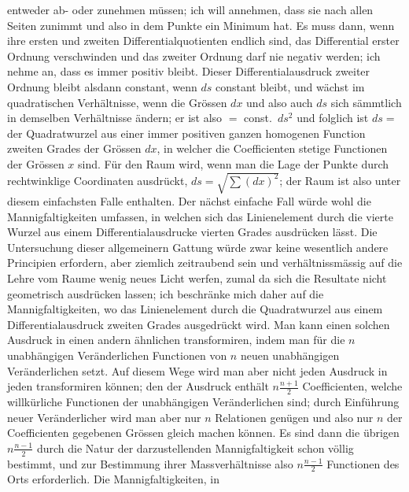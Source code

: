 \documentclass[a4paper,12pt]{article}
\begin{document}
entweder ab- oder zunehmen m\"{u}ssen; ich will annehmen, dass
sie nach allen Seiten zunimmt und also in dem Punkte ein Minimum
hat.  Es muss dann, wenn ihre ersten und zweiten
Differentialquotienten endlich sind, das Differential erster
Ordnung verschwinden und das zweiter Ordnung darf nie negativ
werden; ich nehme an, dass es immer positiv bleibt.  Dieser
Differentialausdruck zweiter Ordnung bleibt alsdann constant,
wenn $ds$ constant bleibt, und w\"{a}chst im quadratischen
Verh\"{a}ltnisse, wenn die Gr\"{o}ssen $dx$ und also auch $ds$
sich s\"{a}mmtlich in demselben Verh\"{a}ltnisse \"{a}ndern; er
ist also $=$ const.~$ds^2$ und folglich ist $ds =$ der
Quadratwurzel aus einer immer positiven ganzen homogenen Function
zweiten Grades der Gr\"{o}ssen $dx$, in welcher die Coefficienten
stetige Functionen der Gr\"{o}ssen $x$ sind.  F\"{u}r den Raum
wird, wenn man die Lage der Punkte durch rechtwinklige
Coordinaten ausdr\"{u}ckt,
$ds = \sqrt{ \sum (dx)^2 }$;
der Raum ist also unter diesem einfachsten Falle enthalten.  Der
n\"{a}chst einfache Fall w\"{u}rde wohl die Mannigfaltigkeiten
umfassen, in welchen sich das Linienelement durch die vierte
Wurzel aus einem Differentialausdrucke vierten Grades
ausdr\"{u}cken l\"{a}sst.  Die Untersuchung dieser allgemeinern
Gattung w\"{u}rde zwar keine wesentlich andere Principien
erfordern, aber ziemlich zeitraubend sein und
verh\"{a}ltnissm\"{a}ssig auf die Lehre vom Raume wenig neues
Licht werfen, zumal da sich die Resultate nicht geometrisch
ausdr\"{u}cken lassen; ich beschr\"{a}nke mich daher auf die
Mannigfaltigkeiten, wo das Linienelement durch die Quadratwurzel
aus einem Differentialausdruck zweiten Grades ausgedr\"{u}ckt
wird.  Man kann einen solchen Ausdruck in einen andern
\"{a}hnlichen transformiren, indem man f\"{u}r die $n$
unabh\"{a}ngigen Ver\"{a}nderlichen Functionen von $n$ neuen
unabh\"{a}ngigen Ver\"{a}nderlichen setzt.  Auf diesem Wege wird
man aber nicht jeden Ausdruck in jeden transformiren k\"{o}nnen;
den der Ausdruck enth\"{a}lt
$\displaystyle n \frac{n+1}{2}$
Coefficienten, welche willk\"{u}rliche Functionen der
unabh\"{a}ngigen Ver\"{a}nderlichen sind; durch Einf\"{u}hrung
neuer Ver\"{a}nderlicher wird man aber nur $n$ Relationen
gen\"{u}gen und also nur $n$ der Coefficienten gegebenen
Gr\"{o}ssen gleich machen k\"{o}nnen.  Es sind dann die
\"{u}brigen
$\displaystyle n \frac{n-1}{2}$
durch die Natur der darzustellenden Mannigfaltigkeit schon
v\"{o}llig bestimmt, und zur Bestimmung ihrer
Massverh\"{a}ltnisse also $\displaystyle n \frac{n-1}{2}$
Functionen des Orts erforderlich.  Die Mannigfaltigkeiten, in
\end{document}

